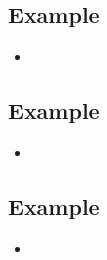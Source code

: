 \subsection{Example}
\begin{frame}{\insertsubsection}
	\begin{fancycolumns}
		\begin{definition}{\insertsubsection}
			\begin{itemize}
				\item 
			\end{itemize}
		\end{definition}
		\nextcolumn
	\end{fancycolumns}
\end{frame}

\subsection{Example}
\begin{frame}{\insertsubsection}
	\begin{fancycolumns}
		\begin{definition}{\insertsubsection}
			\begin{itemize}
				\item 
			\end{itemize}
		\end{definition}
		\nextcolumn
	\end{fancycolumns}
\end{frame}

\subsection{Example}
\begin{frame}{\insertsubsection}
	\begin{fancycolumns}
		\begin{definition}{\insertsubsection}
			\begin{itemize}
				\item 
			\end{itemize}
		\end{definition}
		\nextcolumn
	\end{fancycolumns}
\end{frame}

